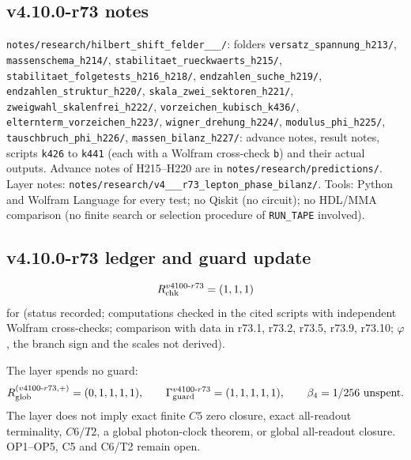 \subsection*{v4.10.0-r73 notes}
\label{subsec:v4100-r73-notes}

{\raggedright
\texttt{notes/\allowbreak research/\allowbreak hilbert\_\allowbreak shift\_\allowbreak felder\_\_\_/}: folders
\texttt{versatz\_\allowbreak spannung\_\allowbreak h213/}, \texttt{massenschema\_\allowbreak h214/}, \texttt{stabilitaet\_\allowbreak rueckwaerts\_\allowbreak h215/},
\texttt{stabilitaet\_\allowbreak folgetests\_\allowbreak h216\_\allowbreak h218/}, \texttt{endzahlen\_\allowbreak suche\_\allowbreak h219/},
\texttt{endzahlen\_\allowbreak struktur\_\allowbreak h220/}, \texttt{skala\_\allowbreak zwei\_\allowbreak sektoren\_\allowbreak h221/},
\texttt{zweigwahl\_\allowbreak skalenfrei\_\allowbreak h222/}, \texttt{vorzeichen\_\allowbreak kubisch\_\allowbreak k436/},
\texttt{elternterm\_\allowbreak vorzeichen\_\allowbreak h223/}, \texttt{wigner\_\allowbreak drehung\_\allowbreak h224/},
\texttt{modulus\_\allowbreak phi\_\allowbreak h225/}, \texttt{tauschbruch\_\allowbreak phi\_\allowbreak h226/}, \texttt{massen\_\allowbreak bilanz\_\allowbreak h227/}:
advance notes, result notes, scripts \texttt{k426} to \texttt{k441} (each with a Wolfram cross-check \texttt{b}) and their actual outputs.
Advance notes of H215--H220 are in \texttt{notes/\allowbreak research/\allowbreak predictions/}.  Layer notes:
\texttt{notes/\allowbreak research/\allowbreak v4\_\_\_\allowbreak r73\_\allowbreak lepton\_\allowbreak phase\_\allowbreak bilanz/}.
Tools: Python and Wolfram Language for every test; no Qiskit (no circuit); no HDL/MMA comparison (no finite search or selection procedure
of \texttt{RUN\_TAPE} involved).
\par}

\subsection*{v4.10.0-r73 ledger and guard update}
\label{subsec:v4100-r73-ledger-guard}

\[
R_{\rm chk}^{v4100\text{-}r73}=(1,1,1)
\]
for (status recorded; computations checked in the cited scripts with independent Wolfram cross-checks; comparison with data in r73.1, r73.2,
r73.5, r73.9, r73.10; \(\varphi\), the branch sign and the scales not derived).

The layer spends no guard:
\[
R_{\rm glob}^{(v4100\text{-}r73,+)}=(0,1,1,1,1),
\qquad
\Gamma_{\rm guard}^{v4100\text{-}r73}=(1,1,1,1,1),
\qquad
\beta_4=1/256\ \text{unspent}.
\]
The layer does not imply exact finite \(C5\) zero closure, exact all-readout terminality, \(C6/T2\), a global photon-clock theorem,
or global all-readout closure.  OP1--OP5, C5 and C6/T2 remain open.
